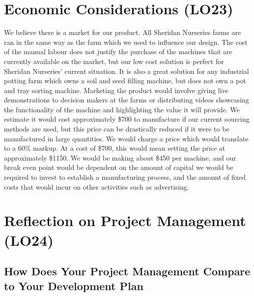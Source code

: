 \documentclass{article}
\begin{document}
\section{Economic Considerations (LO23)}


We believe there is a market for our product. All Sheridan Nurseries farms are ran in the same way 
as the farm which we used to influence our design. The cost of the manual labour does not justify the 
purchase of the machines that are currently available on the market, but our low cost solution is perfect 
for Sheridan Nurseries' current situation. It is also a great solution for any industrial potting farm which 
owns a soil and seed filling machine, but does not own a pot and tray sorting machine. Marketing the product 
would involve giving live demonstrations to decision makers at the farms or distributing videos showcasing the functionality 
of the machine and highlighting the value it will provide. We estimate it would cost approximately \$700 to manufacture 
if our current sourcing methods are used, but this price can be drastically reduced if it were to be manufactured in large 
quantities. We would charge a price which would translate to a 60\% markup. At a cost of \$700, this would mean setting the price 
at approximately \$1150. We would be making about \$450 per machine, and our break even point would be dependent on the amount of 
capital we would be required to invest to establish a manufacturing process, and the amount of fixed costs that would incur on other 
activities such as advertising.

\section{Reflection on Project Management (LO24)}


\subsection{How Does Your Project Management Compare to Your Development Plan}
\end{document}
